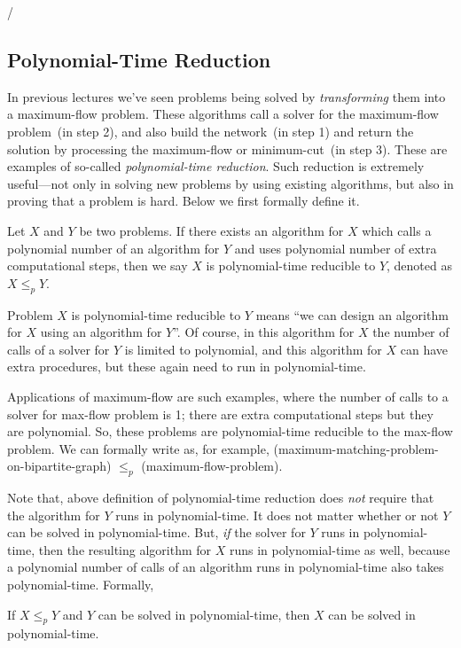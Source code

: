 /%
\subsection*{Polynomial-Time Reduction}

In previous lectures we've seen problems being solved by
\emph{transforming} them into a maximum-flow problem. These algorithms call a
solver for the maximum-flow problem~(in step 2), and also build the network~(in step 1)
and return the solution by processing the maximum-flow or minimum-cut~(in step 3). 
These are examples of so-called \emph{polynomial-time reduction}.
Such {reduction} is extremely useful---not only in solving new problems by using existing algorithms,
but also in proving that a problem is hard. Below we first formally define it.

\begin{definition}
Let $X$ and $Y$ be two problems.
If there exists an algorithm for $X$ which
calls a polynomial number of an algorithm for $Y$
and uses polynomial number of extra computational steps,
then we say $X$ is polynomial-time reducible to $Y$, denoted as $X \le_p Y$.
\end{definition}

Problem $X$ is polynomial-time reducible to $Y$ means ``we can design an algorithm for $X$ using an algorithm for $Y$''.
Of course, in this algorithm for $X$ the number of calls of a solver for $Y$ is limited to polynomial, and this algorithm for $X$
can have extra procedures, but these again need to run in polynomial-time.

Applications of maximum-flow are such examples, where the number of calls
to a solver for max-flow problem is 1; there are extra computational steps 
but they are polynomial. So, these problems are polynomial-time reducible to the max-flow problem.
We can formally write as, for example,
(maximum-matching-problem-on-bipartite-graph) $\le_p$ (maximum-flow-problem).

Note that, above definition of polynomial-time reduction does \emph{not} require that
the algorithm for $Y$ runs in polynomial-time. It does not matter whether or not $Y$ can
be solved in polynomial-time. But, \emph{if} the solver for $Y$ runs in polynomial-time,
then the resulting algorithm for $X$ runs in polynomial-time as well, because 
a polynomial number of calls of an algorithm runs in polynomial-time also takes polynomial-time.
Formally,
\begin{fact}
If $X\le_p Y$ and $Y$ can be solved in polynomial-time, then $X$ can be solved in polynomial-time.
\end{fact}

